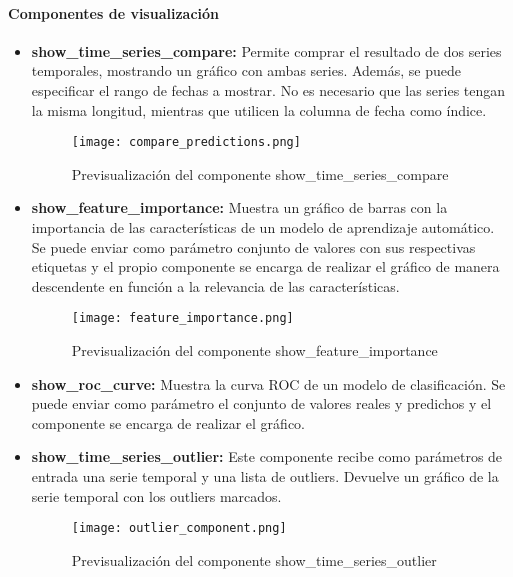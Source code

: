 \paragraph{Componentes de visualización}
\begin{itemize}
    \item \textbf{show\_time\_series\_compare:} Permite comprar el resultado de dos series temporales,
    mostrando un gráfico con ambas series. Además, se puede especificar el rango de fechas a mostrar.
    No es necesario que las series tengan la misma longitud, mientras que utilicen la columna de fecha
    como índice.
    \begin{figure}[ht]
        \centering
        \texttt{[image: compare\_predictions.png]}
        \caption{Previsualización del componente show\_time\_series\_compare}
        \label{fig:compare_predictions}
    \end{figure}
    \item \textbf{show\_feature\_importance:} Muestra un gráfico de barras con la importancia de las
    características de un modelo de aprendizaje automático. Se puede enviar como parámetro conjunto 
    de valores con sus respectivas etiquetas y el propio componente se encarga de realizar el gráfico
    de manera descendente en función a la relevancia de las características.
    \begin{figure}[ht]
        \centering
        \texttt{[image: feature\_importance.png]}
        \caption{Previsualización del componente show\_feature\_importance}
        \label{fig:feature_importance}
    \end{figure}
    \item \textbf{show\_roc\_curve:} Muestra la curva ROC de un modelo de clasificación. Se puede
    enviar como parámetro el conjunto de valores reales y predichos y el componente se encarga de
    realizar el gráfico.
    \item \textbf{show\_time\_series\_outlier:} Este componente recibe como parámetros de entrada
    una serie temporal y una lista de outliers. Devuelve un gráfico de la serie temporal con los
    outliers marcados. 
    \begin{figure}[ht]
        \centering
        \texttt{[image: outlier\_component.png]}
        \caption{Previsualización del componente show\_time\_series\_outlier}
        \label{fig:outlier_component}
    \end{figure}
\end{itemize}


